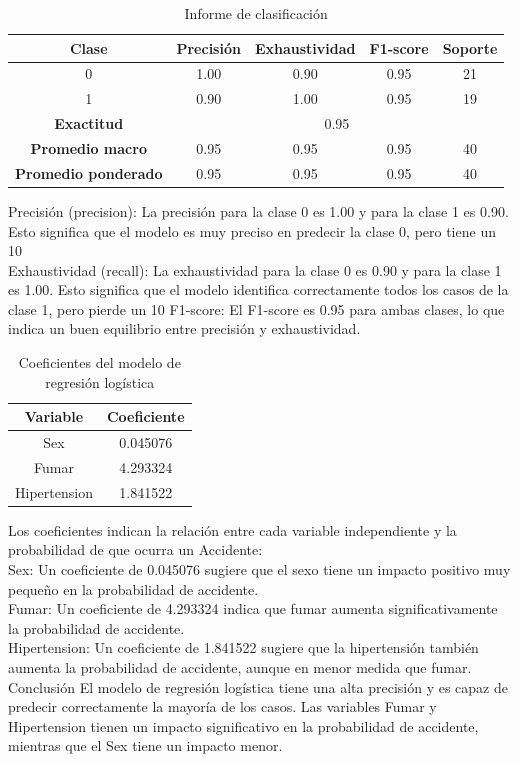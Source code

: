 \documentclass[a4paper, 12pt]{article}
\begin{document}
\begin{table}[H]
    \centering
    \begin{tabular}{|c|c|c|c|c|}
        \hline
        Clase & Precisión & Exhaustividad & F1-score & Soporte \\ \hline
        0 & 1.00 & 0.90 & 0.95 & 21 \\ \hline
        1 & 0.90 & 1.00 & 0.95 & 19 \\ \hline
        \textbf{Exactitud} & \multicolumn{4}{c|}{0.95} \\ \hline
        \textbf{Promedio macro} & 0.95 & 0.95 & 0.95 & 40 \\ \hline
        \textbf{Promedio ponderado} & 0.95 & 0.95 & 0.95 & 40 \\ \hline
    \end{tabular}
    \caption{Informe de clasificación}
    \label{tab:classification_report}
\end{table}


Precisión (precision): La precisión para la clase 0 es 1.00 y para la clase 1 es 0.90. Esto significa que el modelo es muy preciso en predecir la clase 0, pero tiene un 10%
\\
Exhaustividad (recall): La exhaustividad para la clase 0 es 0.90 y para la clase 1 es 1.00. Esto significa que el modelo identifica correctamente todos los casos de la clase 1, pero pierde un 10%
F1-score: El F1-score es 0.95 para ambas clases, lo que indica un buen equilibrio entre precisión y exhaustividad.

\begin{table}[H]
    \centering
    \begin{tabular}{|c|c|}
        \hline
        Variable & Coeficiente \\ \hline
        Sex & 0.045076 \\ \hline
        Fumar & 4.293324 \\ \hline
        Hipertension & 1.841522 \\ \hline
    \end{tabular}
    \caption{Coeficientes del modelo de regresión logística}
    \label{tab:coeficientes_modelo}
\end{table}

Los coeficientes indican la relación entre cada variable independiente y la probabilidad de que ocurra un Accidente:
\\
Sex: Un coeficiente de 0.045076 sugiere que el sexo tiene un impacto positivo muy pequeño en la probabilidad de accidente.
\\
Fumar: Un coeficiente de 4.293324 indica que fumar aumenta significativamente la probabilidad de accidente.
\\
Hipertension: Un coeficiente de 1.841522 sugiere que la hipertensión también aumenta la probabilidad de accidente, aunque en menor medida que fumar.
\\
Conclusión
El modelo de regresión logística tiene una alta precisión y es capaz de predecir correctamente 
la mayoría de los casos. Las variables Fumar y Hipertension tienen un impacto significativo en 
la probabilidad de accidente, mientras que el Sex tiene un impacto menor.
\end{document}
